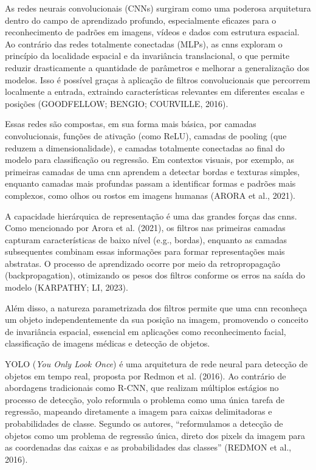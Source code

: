 As redes neurais convolucionais (CNNs) surgiram como uma poderosa arquitetura dentro do campo de aprendizado profundo, especialmente eficazes para o reconhecimento de padrões em imagens, vídeos e dados com estrutura espacial. 
Ao contrário das redes totalmente conectadas (MLPs), as \acp{cnn} exploram o princípio da localidade espacial e da invariância translacional, o que permite reduzir drasticamente a quantidade de parâmetros e melhorar a generalização dos modelos. 
Isso é possível graças à aplicação de filtros convolucionais que percorrem localmente a entrada, extraindo características relevantes em diferentes escalas e posições (GOODFELLOW; BENGIO; COURVILLE, 2016).

Essas redes são compostas, em sua forma mais básica, por camadas convolucionais, funções de ativação (como ReLU), camadas de pooling (que reduzem a dimensionalidade), e camadas totalmente conectadas ao final do modelo para classificação ou regressão. 
Em contextos visuais, por exemplo, as primeiras camadas de uma \ac{cnn} aprendem a detectar bordas e texturas simples, enquanto camadas mais profundas passam a identificar formas e padrões mais complexos, 
como olhos ou rostos em imagens humanas (ARORA et al., 2021).

A capacidade hierárquica de representação é uma das grandes forças das \acp{cnn}. Como mencionado por Arora et al. (2021), os filtros nas primeiras camadas capturam características de baixo nível (e.g., bordas), 
enquanto as camadas subsequentes combinam essas informações para formar representações mais abstratas. O processo de aprendizado ocorre por meio da retropropagação (backpropagation), 
otimizando os pesos dos filtros conforme os erros na saída do modelo (KARPATHY; LI, 2023).

Além disso, a natureza parametrizada dos filtros permite que uma \ac{cnn} reconheça um objeto independentemente da sua posição na imagem, promovendo o conceito de invariância espacial, 
essencial em aplicações como reconhecimento facial, classificação de imagens médicas e detecção de objetos.


YOLO (\textit{You Only Look Once}) é uma arquitetura de rede neural para detecção de objetos em tempo real, proposta por Redmon et al. (2016). 
Ao contrário de abordagens tradicionais como R-CNN, que realizam múltiplos estágios no processo de detecção, \ac{yolo} reformula o problema como uma única tarefa de regressão, mapeando diretamente a imagem para caixas delimitadoras e probabilidades de classe. 
Segundo os autores, ``reformulamos a detecção de objetos como um problema de regressão única, direto dos pixels da imagem para as coordenadas das caixas e as probabilidades das classes'' (REDMON et al., 2016).

